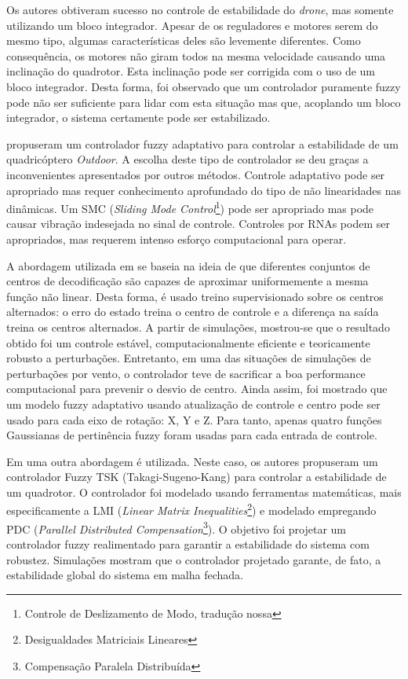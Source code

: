 Os autores obtiveram sucesso no controle de estabilidade do \textit{drone}, mas somente utilizando um bloco integrador. Apesar de os reguladores e motores serem do mesmo tipo, algumas características deles são levemente diferentes. Como consequência, os motores não giram todos na mesma velocidade causando uma inclinação do quadrotor. Esta inclinação pode ser corrigida com o uso de um bloco integrador. Desta forma, foi observado que um controlador puramente fuzzy pode não ser suficiente para lidar com esta situação mas que, acoplando um bloco integrador, o sistema certamente pode ser estabilizado.

 propuseram um controlador fuzzy adaptativo para controlar a estabilidade de um quadricóptero \textit{Outdoor}. A escolha deste tipo de controlador se deu graças a inconvenientes apresentados por outros métodos. Controle adaptativo pode ser apropriado mas requer conhecimento aprofundado do tipo de não linearidades nas dinâmicas. Um SMC (\textit{Sliding Mode Control}\footnote{Controle de Deslizamento de Modo, tradução nossa}) pode ser apropriado mas pode causar vibração indesejada no sinal de controle. Controles por RNAs podem ser apropriados, mas requerem intenso esforço computacional para operar.

A abordagem utilizada em \cite{Coza2006} se baseia na ideia de que diferentes conjuntos de centros de decodificação são capazes de aproximar uniformemente a mesma função não linear. Desta forma, é usado treino supervisionado sobre os centros alternados: o erro do estado treina o centro de controle e a diferença na saída treina os centros alternados. A partir de simulações, mostrou-se que o resultado obtido foi um controle estável, computacionalmente eficiente e teoricamente robusto a perturbações. Entretanto, em uma das situações de simulações de perturbações por vento, o controlador teve de sacrificar a boa performance computacional para prevenir o desvio de centro. Ainda assim, foi mostrado que um modelo fuzzy adaptativo usando atualização de controle e centro pode ser usado para cada eixo de rotação: X, Y e Z. Para tanto, apenas quatro funções Gaussianas de pertinência fuzzy foram usadas para cada entrada de controle.

Em \cite{Rabhi2011} uma outra abordagem é utilizada. Neste caso, os autores propuseram um controlador Fuzzy TSK (Takagi-Sugeno-Kang) para controlar a estabilidade de um quadrotor. O controlador foi modelado usando ferramentas matemáticas, mais especificamente a LMI (\textit{Linear Matrix Inequalities}\footnote{Desigualdades Matriciais Lineares}) e modelado empregando PDC (\textit{Parallel Distributed Compensation}\footnote{Compensação Paralela Distribuída}). O objetivo foi projetar um controlador fuzzy realimentado para garantir a estabilidade do sistema com robustez. Simulações mostram que o controlador projetado garante, de fato, a estabilidade global do sistema em malha fechada.

